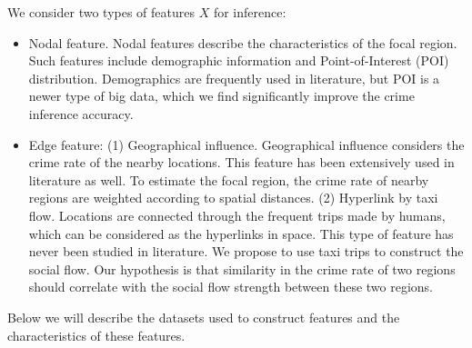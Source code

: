\smallskip
We consider two  types of features $X$ for inference:
\begin{itemize}
\item Nodal feature. Nodal features describe the characteristics of the focal region. Such features include demographic information and Point-of-Interest (POI) distribution. Demographics are frequently used in literature, but POI is a newer type of big data, which we find significantly improve the crime inference accuracy.
\item Edge feature: (1) Geographical influence. Geographical influence considers the crime rate of the nearby locations.  This feature has been extensively used in
literature as well. To estimate the focal region, the
crime rate of nearby regions are weighted according
to spatial distances. (2) Hyperlink by taxi flow. Locations are connected through the frequent trips made by humans, which can be considered as the hyperlinks in space. This type of feature has never been studied in literature. We propose to use taxi trips to construct the social flow. Our hypothesis is that similarity in the crime rate of two regions should correlate with the social flow strength between these two regions. 
\end{itemize}



Below we will describe the datasets used to construct features and the characteristics of these features.


